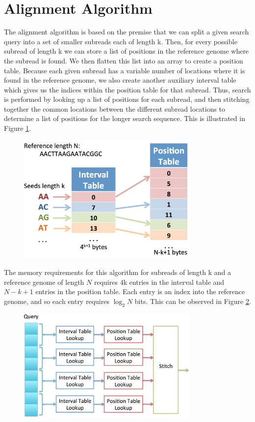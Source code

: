 \documentclass[11pt]{article}
\begin{document}
\section{Alignment Algorithm}

The alignment algorithm is based on the premise that we can split a given search query into a set of smaller subreads each of length k. Then, for every possible subread of length k we can store a list of positions in the reference genome where the subread is found. We then flatten this list into an array to create a position table. Because each given subread has a variable number of locations where it is found in the reference genome, we also create another auxiliary interval table which gives us the indices within the position table for that subread. Thus, search is performed by looking up a list of positions for each subread, and then stitching together the common locations between the different subread locations to determine a list of positions for the longer search sequence.  This is illustrated in Figure \ref{algorithm}.
\begin{figure}[ht!]
\centering
\includegraphics[width=90mm]{algorithm.png}
\caption{}
\label{algorithm}
\end{figure}


The memory requirements for this algorithm for subreads of length k and a reference genome of length $N$ requires 4k entries in the interval table and $N-k+1$ entries in the position table. Each entry is an index into the reference genome, and so each entry requires $\log_2 N$ bits.  This can be observed in Figure \ref{archprocess}.
\begin{figure}[ht!]
\centering
\includegraphics[width=90mm]{archprocess.png}
\caption{}
\label{archprocess}
\end{figure}
\end{document}
